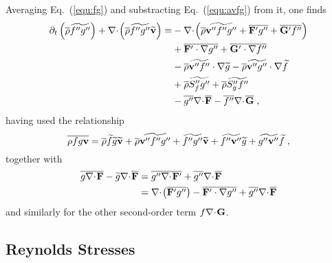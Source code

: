 Averaging Eq.~(\ref{equ:fg}) and substracting Eq.~(\ref{equ:avfg}) from it, one finds
\begin{equation}\label{equ:covfg}
    \begin{split}
        \ptp{\avr{\rho} \avf{f''g''}}{t} + \dvp{\avr{\rho} \avf{f''g''}\avf{\mathbf{v}}} =
        &-\dvp{\avr{\rho}\avf{\mathbf{v}''f''g''} + \avr{\mathbf{F}'g''} + \avr{\mathbf{G}'f''}} \\
        &+\avr{\mathbf{F}'\cdot\nabla g''} + \avr{\mathbf{G}'\cdot\nabla f''} \\
        &-\avr{\rho}\avf{\mathbf{v}''f''}\cdot\nabla\avf{g} -\avr{\rho}\avf{\mathbf{v}''g''}\cdot\nabla\avf{f} \\
        &+\avr{\rho}\avf{S''_fg''} +\avr{\rho}\avf{S''_gf''} \\
        &-\avr{g''}\dv{\avr{\mathbf{F}}}-\avr{f''}\dv{\avr{\mathbf{G}}}\;,
    \end{split}
\end{equation}
having used the relationship
\begin{equation}
    \overline{\rho fg\mathbf{v}} = \overline{\rho} \widetilde{f}\widetilde{g}\widetilde{\mathbf{v}}
    + \overline{\rho}\widetilde{\mathbf{v}''f''g''}+ \widetilde{f''g''}\widetilde{\mathbf{v}}
    + \widetilde{f''\mathbf{v}''}\widetilde{g}+ \widetilde{g''\mathbf{v}''}\widetilde{f}\;,
\end{equation}
together with
\begin{equation}
    \begin{split}
        \avr{g\dv{\mathbf{F}}}-\avf{g}\dv{\avr{\mathbf{F}}}
        &= \avr{g''\dv{\mathbf{F}'}}+\avr{g''}\dv{\avr{\mathbf{F}}} \\
        &= \dvp{\avr{\mathbf{F}'g''}}-\avr{\mathbf{F}'\cdot\nabla g''}+\avr{g''}\dv{\avr{\mathbf{F}}}
    \end{split}
\end{equation}
and similarly for the other second-order term $f\nabla\negmedspace\cdot\negthinspace\mathbf{G}$.

\subsection{Reynolds Stresses}

